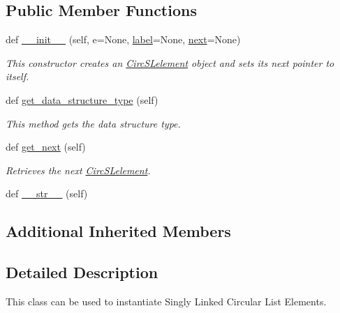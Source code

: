 \subsection*{Public Member Functions}
\begin{DoxyCompactItemize}
\item 
def \mbox{\hyperlink{classbridges_1_1circ__sl__element_1_1_circ_s_lelement_a691e2db0878e32d0298204685a120268}{\+\_\+\+\_\+init\+\_\+\+\_\+}} (self, e=None, \mbox{\hyperlink{classbridges_1_1element_1_1_element_a97551dbb005cd5d1f13b65461290c6e3}{label}}=None, \mbox{\hyperlink{classbridges_1_1sl__element_1_1_s_lelement_a4fa8e9321dd2ce726da047ddc64adabf}{next}}=None)
\begin{DoxyCompactList}\small\item\em This constructor creates an \mbox{\hyperlink{classbridges_1_1circ__sl__element_1_1_circ_s_lelement}{Circ\+S\+Lelement}} object and sets its next pointer to itself. \end{DoxyCompactList}\item 
def \mbox{\hyperlink{classbridges_1_1circ__sl__element_1_1_circ_s_lelement_a82b1dbb8592c943eb68161ee60ac3492}{get\+\_\+data\+\_\+structure\+\_\+type}} (self)
\begin{DoxyCompactList}\small\item\em This method gets the data structure type. \end{DoxyCompactList}\item 
def \mbox{\hyperlink{classbridges_1_1circ__sl__element_1_1_circ_s_lelement_acd9041487068ad5b8e9b68dfcdff4829}{get\+\_\+next}} (self)
\begin{DoxyCompactList}\small\item\em Retrieves the next \mbox{\hyperlink{classbridges_1_1circ__sl__element_1_1_circ_s_lelement}{Circ\+S\+Lelement}}. \end{DoxyCompactList}\item 
def \mbox{\hyperlink{classbridges_1_1circ__sl__element_1_1_circ_s_lelement_af43d07b196276fea57e9d43caf9f6c98}{\+\_\+\+\_\+str\+\_\+\+\_\+}} (self)
\end{DoxyCompactItemize}
\subsection*{Additional Inherited Members}


\subsection{Detailed Description}
This class can be used to instantiate Singly Linked Circular List Elements. 

